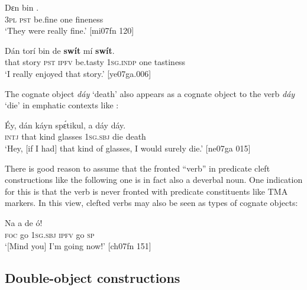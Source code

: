 \ea%
    \label{ex:key:1195}
    \gll Dɛn  bin        .\\
\textsc{3pl}  \textsc{pst}  be.fine  one    fineness  \\

\glt ‘They were really fine.’ [mi07fn 120]
\z


\ea%
    \label{ex:key:1196}
    \gll Dán    torí    bin  de  \textbf{swít}    mí        \textbf{swít}.\\
that    story  \textsc{pst}  \textsc{ipfv}  be.tasty  \textsc{1sg.indp}  one    tastiness\\

\glt ‘I really enjoyed that story.’ [ye07ga.006]
\z

The cognate object \textit{dáy} ‘death’ also appears as a cognate object to the verb \textit{dáy} ‘die’ in emphatic contexts like :


\ea%
    \label{ex:key:1197}
    \gll \'{E}y,  dán  káyn  spɛ́tikul,  a    dáy  dáy.\\
\textsc{intj}  that  kind    glasses  \textsc{1sg.sbj}  die  death\\

\glt ‘Hey, [if I had] that kind of glasses, I would surely die.’ [ne07ga 015]
\z

There is good reason to assume that the fronted “verb” in predicate cleft constructions like the following one is in fact also a deverbal noun. One indication for this is that the verb is never fronted with predicate constituents like TMA markers. In this view, clefted verbs may also be seen as types of cognate objects: 


\ea%
    \label{ex:key:1198}
    \gll Na    a    de    ó!\\
\textsc{foc}  go  \textsc{1sg.sbj}  \textsc{ipfv}  go  \textsc{sp}\\

\glt ‘[Mind you] I’m going now!’ [ch07fn 151]
\z

\subsection{Double-object constructions}\label{sec:9.3.4}

